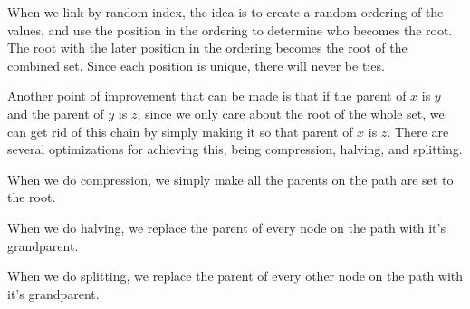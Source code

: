 \documentclass[conference]{IEEEtran}
\begin{document}
When we link by random index, the idea is to create a random ordering of the values, and use the position in the ordering to determine who becomes the root. The root with the later position in the ordering becomes the root of the combined set. Since each position is unique, there will never be ties.



Another point of improvement that can be made is that if the parent of $x$ is $y$ and the parent of $y$ is $z$, since we only care about the root of the whole set, we can get rid of this chain by simply making it so that parent of $x$ is $z$. There are several optimizations for achieving this, being compression, halving, and splitting.

When we do compression, we simply make all the parents on the path are set to the root.



When we do halving, we replace the parent of every node on the path with it's grandparent.



When we do splitting, we replace the parent of every other node on the path with it's grandparent.


\end{document}
